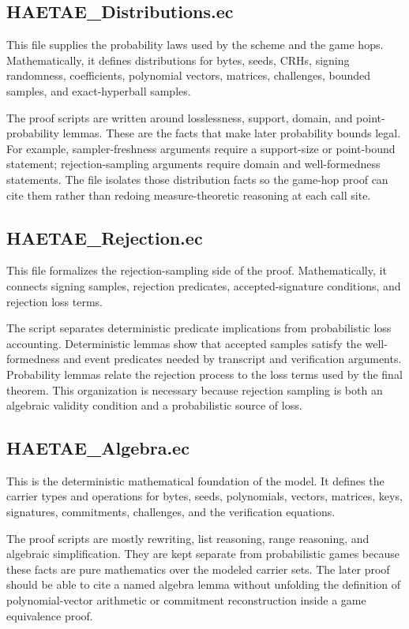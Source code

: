 \documentclass[11pt]{article}
\begin{document}
\subsection*{HAETAE\_Distributions.ec}

This file supplies the probability laws used by the scheme and the game hops.
Mathematically, it defines distributions for bytes, seeds, CRHs, signing
randomness, coefficients, polynomial vectors, matrices, challenges, bounded
samples, and exact-hyperball samples.

The proof scripts are written around losslessness, support, domain, and
point-probability lemmas.  These are the facts that make later probability
bounds legal.  For example, sampler-freshness arguments require a support-size
or point-bound statement; rejection-sampling arguments require domain and
well-formedness statements.  The file isolates those distribution facts so the
game-hop proof can cite them rather than redoing measure-theoretic reasoning at
each call site.

\subsection*{HAETAE\_Rejection.ec}

This file formalizes the rejection-sampling side of the proof.  Mathematically,
it connects signing samples, rejection predicates, accepted-signature
conditions, and rejection loss terms.

The script separates deterministic predicate implications from probabilistic
loss accounting.  Deterministic lemmas show that accepted samples satisfy the
well-formedness and event predicates needed by transcript and verification
arguments.  Probability lemmas relate the rejection process to the loss terms
used by the final theorem.  This organization is necessary because rejection
sampling is both an algebraic validity condition and a probabilistic source of
loss.

\subsection*{HAETAE\_Algebra.ec}

This is the deterministic mathematical foundation of the model.  It defines the
carrier types and operations for bytes, seeds, polynomials, vectors, matrices,
keys, signatures, commitments, challenges, and the verification equations.

The proof scripts are mostly rewriting, list reasoning, range reasoning, and
algebraic simplification.  They are kept separate from probabilistic games
because these facts are pure mathematics over the modeled carrier sets.  The
later proof should be able to cite a named algebra lemma without unfolding the
definition of polynomial-vector arithmetic or commitment reconstruction inside
a game equivalence proof.
\end{document}
